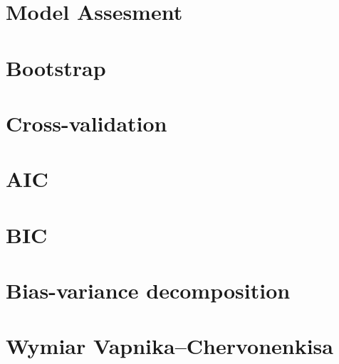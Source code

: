 \documentclass[a4paper]{beamer}
\begin{document}
\section{Model Assesment}
\begin{frame}

\end{frame}

\section{Bootstrap}
\begin{frame}

\end{frame}

\section{Cross-validation}
\begin{frame}

\end{frame}

\section{AIC}
\begin{frame}

\end{frame}

\section{BIC}
\begin{frame}

\end{frame}

\section{Bias-variance decomposition}
\begin{frame}

\end{frame}

\section{Wymiar Vapnika–Chervonenkisa}
\begin{frame}

\end{frame}
\end{document}
